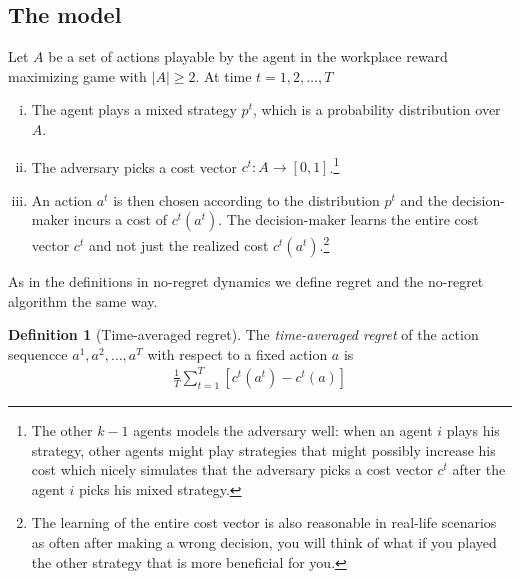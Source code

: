 \documentclass[a4paper,10pt]{article}
\theoremstyle{definition}
\newtheorem{defn}[thm]{Definition}
\begin{document}
\subsection*{The model} 
Let $A$ be a set of actions playable by the agent in the workplace reward maximizing game with $|A|\geq 2$. At time $t=1,2,\ldots, T$
\begin{enumerate}[(i)]
\item The agent plays a mixed strategy $p^t$, which is a probability distribution over $A$.
\item The adversary picks a cost vector $c^t: A \to [0,1]$.\footnote{The other $k-1$ agents models the adversary well: when an agent $i$ plays his strategy, other agents might play strategies that might possibly increase his cost which nicely simulates that the adversary picks a cost vector $c^t$ after the agent $i$ picks his mixed strategy.}
\item An action $a^t$ is then chosen according to the distribution $p^t$ and the decision-maker incurs a cost of $c^t(a^t)$. The decision-maker learns the entire cost vector $c^t$ and not just the realized cost $c^t(a^t)$.\footnote{The learning of the entire cost vector is also reasonable in real-life scenarios as often after making a wrong decision, you will think of what if you played the other strategy that is more beneficial for you.}
\end{enumerate}

As in the definitions in no-regret dynamics we define regret and the no-regret algorithm the same way.

\begin{defn}[Time-averaged regret]
The \emph{time-averaged regret} of the action sequencce $a^1,a^2,\ldots, a^T$ with respect to a fixed action $a$ is 
\begin{align*}
\frac{1}{T}\sum_{t=1}^{T}\left[c^t(a^t)-c^t(a)\right]
\end{align*}	
\end{defn}
\end{document}
